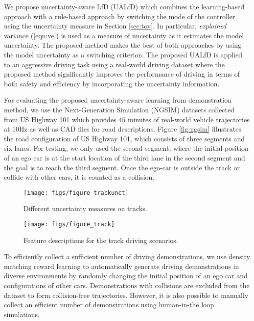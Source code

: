 \documentclass[letterpaper, 10 pt, conference]{ieeeconf}  %
\begin{document}
We propose uncertainty-aware LfD (UALfD) which
combines the learning-based approach with
a rule-based approach by switching the mode of the controller 
using the uncertainty measure in Section \ref{sec:toy}. 
In particular, 
\textit{explained} variance (\ref{eqn:ve}) is used as a measure
of uncertainty 
as it estimates the model uncertainty.
The proposed method makes the best of both approaches
by using the model uncertainty as a switching criterion.
The proposed UALfD is applied to an aggressive driving task
using a real-world driving dataset \cite{Colyar_07}
where the proposed method significantly improves the 
performance of driving in terms of both safety and efficiency
by incorporating the uncertainty information. 

For evaluating the proposed uncertainty-aware learning from demonstration
method, we use the Next-Generation Simulation (NGSIM)
datasets collected from
US Highway 101 \cite{Colyar_07} which provides
$45$ minutes of real-world vehicle trajectories at $10$Hz
as well as CAD files for road descriptions. 
Figure \ref{fig:ngsim} illustrates the road configuration of 
US Highway 101, which consists of three segments
and six lanes. 
For testing, we only used the second segment, where the initial position 
of an ego car is at the start location of the third lane in the second segment
and the goal is to reach the third segment. 
Once the ego-car is outside the track or collide with other cars, 
it is counted as a collision. 


\begin{figure}[!t] \centering
	\texttt{[image: figs/figure\_trackunct]}
	\label{fig:trackres_a}
	\caption{
		Different uncertainty measures on
		tracks. 
		}
	\label{fig:trackres}
\end{figure}

\begin{figure}[!t] \centering
	\texttt{[image: figs/figure\_track]}
	\caption{
		Feature descriptions for the track driving scenarios. 
		}
	\label{fig:trackfeat}
\end{figure}



To efficiently collect a sufficient number of driving demonstrations, 
we use density matching reward learning \cite{SJChoi_16_DMRL}
to automatically generate driving demonstrations 
in diverse environments by randomly changing
the initial position of an ego car 
and configurations of other cars. 
Demonstrations with collisions are excluded from the dataset
to form collision-free trajectories. 
However, it is also possible to manually collect an efficient number
of demonstrations using human-in-the loop simulations. 
\end{document}
